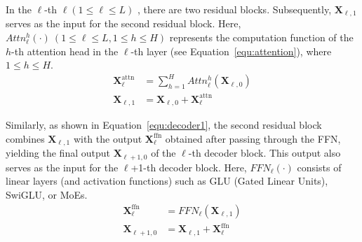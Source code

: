 \documentclass[12pt,letterpaper]{article}
\begin{document}
In the $\ell$-th $\ell \left(1\leq \ell \leq L\right)$ , there are two residual blocks.
Subsequently, $\mathbf{X}_{\ell,1}$ serves as the input for the second residual block. Here, $Attn_{\ell}^{h}\left(\cdot\right)\  \left(1\leq \ell \leq L, 1\leq h \leq H\right)$ represents the computation function of the $h$-th attention head in the $\ell$-th layer (see Equation~\ref{equ:attention}), where $1 \leq h \leq H$.
\begin{equation} \label{equ:decoder0}
\begin{aligned}
    \mathbf{X}_{\ell}^{\text{attn}} &= \sum_{h=1}^{H}{Attn_{\ell}^{h}}\left(\mathbf{X}_{\ell,0}\right) \\
    \mathbf{X}_{\ell,1} &= \mathbf{X}_{\ell,0} + \mathbf{X}_{\ell}^{\text{attn}}
\end{aligned}
\end{equation}

Similarly, as shown in Equation~\ref{equ:decoder1}, the second residual block combines $\mathbf{X}_{\ell,1}$ with the output $\mathbf{X}_{\ell}^{\text{ffn}}$ obtained after passing through the FFN, yielding the final output $\mathbf{X}_{\ell+1,0}$ of the $\ell$-th decoder block. This output also serves as the input for the $\ell$+1-th decoder block. Here, $FFN_{\ell}\left(\cdot\right)$ consists of linear layers (and activation functions) such as GLU (Gated Linear Units), SwiGLU,\citep{GLU_2020_arXiv_Google} or MoEs.\citep{MOETransformer,SurveyMOE_24_arXiv_HKUST}
\begin{equation} \label{equ:decoder1}
\begin{aligned}
    \mathbf{X}_{\ell}^{\text{ffn}} &= FFN_{\ell}\left(\mathbf{X}_{\ell,1}\right) \\
    \mathbf{X}_{\ell+1,0} &= \mathbf{X}_{\ell,1} + \mathbf{X}_{\ell}^{\text{ffn}}
\end{aligned}
\end{equation}
\end{document}
